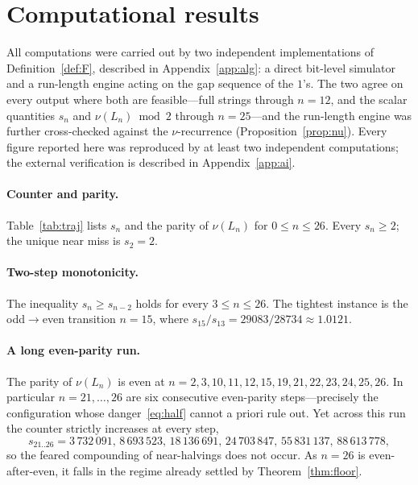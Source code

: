 \documentclass[11pt,reqno]{amsart}
\theoremstyle{plain}
\theoremstyle{definition}
\theoremstyle{remark}
\begin{document}
\section{Computational results}\label{sec:comp}
All computations were carried out by two independent implementations of Definition~\ref{def:F}, described in Appendix~\ref{app:alg}: a direct bit-level simulator and a run-length engine acting on the gap sequence of the $1$'s. The two agree on every output where both are feasible---full strings through $n=12$, and the scalar quantities $s_n$ and $\nu(L_n)\bmod 2$ through $n=25$---and the run-length engine was further cross-checked against the $\nu$-recurrence (Proposition~\ref{prop:nu}). Every figure reported here was reproduced by at least two independent computations; the external verification is described in Appendix~\ref{app:ai}.

\paragraph{Counter and parity.} Table~\ref{tab:traj} lists $s_n$ and the parity of $\nu(L_n)$ for $0\le n\le 26$. Every $s_n\ge 2$; the unique near miss is $s_2=2$.

\paragraph{Two-step monotonicity.} The inequality $s_n\ge s_{n-2}$ holds for every $3\le n\le 26$. The tightest instance is the odd$\to$even transition $n=15$, where $s_{15}/s_{13}=29083/28734\approx 1.0121$.

\paragraph{A long even-parity run.} The parity of $\nu(L_n)$ is even at $n=2,3,10,11,12,15,19,21,22,23,24,25,26$. In particular $n=21,\dots,26$ are six consecutive even-parity steps---precisely the configuration whose danger~\eqref{eq:half} cannot a priori rule out. Yet across this run the counter strictly increases at every step,
\[ s_{21..26}=3\,732\,091,\,8\,693\,523,\,18\,136\,691,\,24\,703\,847,\,55\,831\,137,\,88\,613\,778, \]
so the feared compounding of near-halvings does not occur. As $n=26$ is even-after-even, it falls in the regime already settled by Theorem~\ref{thm:floor}.
\end{document}

